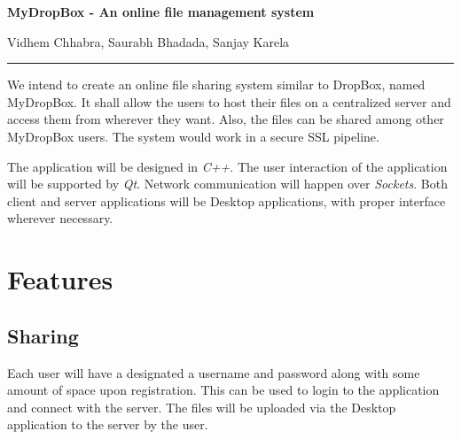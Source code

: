 \documentclass[18pt]{article}
\title{}
\author{}
\date{}
\begin{document}
	\begin{center}
		\fontsize{20pt}{1em} \textbf{MyDropBox - An online file management system}
	\end{center}
	\begin{center}
		\fontsize{15pt}{1em} Vidhem Chhabra, Saurabh Bhadada, Sanjay Karela

		\rule{0.7\textwidth}{.4pt}

	\end{center}
	
	\begingroup
	
	\fontsize{12pt}{1.4em}\selectfont

	We intend to create an online file sharing system similar to DropBox, named MyDropBox. It shall allow the users to host their files on a centralized server and access them from wherever they want. Also, the files can be shared among other MyDropBox users. The system would work in a secure SSL pipeline.
	
	\begin{figure}[h!]
		\vspace{1em}
		\setlength{\fboxsep}{0pt}%
		\setlength{\fboxrule}{1pt}%
		\centerline{}
		\vspace{1em}
	\end{figure}


	The application will be designed in \textit{C++}. The user interaction of the application will be supported by \textit{Qt}. Network communication will happen over \textit{Sockets}. Both client and server applications will be Desktop applications, with proper interface wherever necessary.

	\section{Features}
		\subsection{Sharing}
			Each user will have a designated a username and password along with some amount of space upon registration. This can be used to login to the application and connect with the server. The files will be uploaded via the Desktop application to the server by the user.\\
\end{document}
